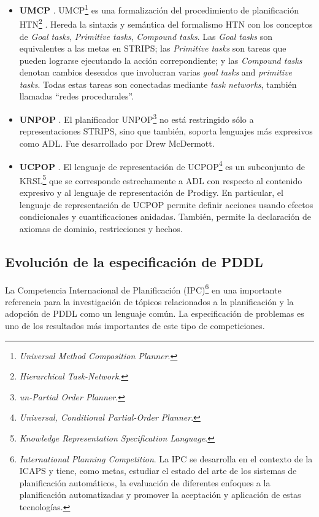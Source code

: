 \begin{itemize}
\item {\bf UMCP} \cite{gbraun:1994:umcp}. UMCP\footnote{\emph{Universal Method 
Composition Planner}.} es una formalizaci\'on del procedimiento de planificaci\'on 
HTN\footnote{\emph{Hierarchical Task-Network}.} \cite{gbaun:Erol:1996:HTN:238496}.
Hereda la sintaxis y sem\'antica del formalismo HTN con los conceptos de 
\emph{Goal tasks}, \emph{Primitive tasks}, \emph{Compound tasks}. 
Las \emph{Goal tasks} son equivalentes a las metas en STRIPS; 
las \emph{Primitive tasks} son tareas que pueden
lograrse ejecutando la acci\'on correpondiente; 
y las \emph{Compound tasks} denotan cambios
deseados que involucran varias \emph{goal tasks} and \emph{primitive tasks}. 
Todas estas tareas son conectadas mediante \emph{task networks}, tambi\'en
llamadas ``redes procedurales''.

\item {\bf UNPOP} \cite{gbraun:unpop}. El planificador 
UNPOP\footnote{\emph{un-Partial Order Planner}.}
no est\'a restringido s\'olo a representaciones STRIPS, sino que tambi\'en,
soporta lenguajes m\'as expresivos como ADL. Fue desarrollado por 
Drew McDermott.

\item {\bf UCPOP} \cite{gbraun:ucpop}. El lenguaje de representaci\'on de
UCPOP\footnote{\emph{Universal, Conditional Partial-Order Planner}.} es 
un subconjunto de KRSL\footnote{\emph{Knowledge Representation Specification 
Language}.} \cite{gbraun:krsl} que se corresponde estrechamente a ADL con respecto 
al contenido expresivo y al lenguaje de representaci\'on de Prodigy. 
En particular, el lenguaje de representaci\'on de UCPOP permite definir 
acciones usando efectos condicionales y cuantificaciones anidadas. 
Tambi\'en, permite la declaraci\'on de axiomas de dominio, restricciones y hechos.

\end{itemize}


\subsection{Evoluci\'on de la especificaci\'on de PDDL} 



La Competencia Internacional de Planificaci\'on (IPC)\footnote{\emph{International Planning 
Competition}. La IPC se desarrolla en el contexto de la ICAPS y tiene, 
como metas, estudiar el estado del arte de los sistemas de 
planificaci\'on autom\'aticos, la evaluaci\'on de diferentes enfoques
a la planificaci\'on automatizadas y promover la aceptaci\'on y 
aplicaci\'on de estas tecnolog\'ias.} en una importante
referencia para la investigaci\'on de t\'opicos relacionados a la planificaci\'on y la 
adopci\'on de PDDL como un lenguaje com\'un. La especificaci\'on de problemas es 
uno de los resultados m\'as importantes de este tipo de competiciones. 

